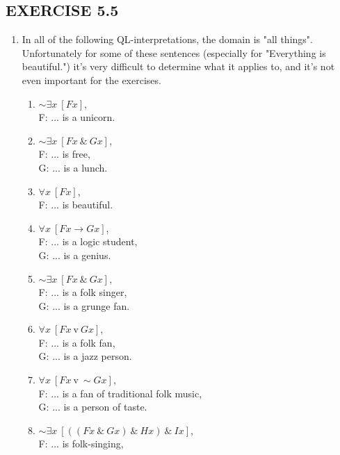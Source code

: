 \documentclass[a4paper,12pt]{article}
\newcommand{\ra}{\rightarrow}
\newcommand{\s}{\sim}
\newcommand{\tv}{ \ \textrm{v} \ }
\newcommand{\ta}{ \ \& \ }
\newcommand{\all}{\forall}
\newcommand{\ex}{\exists}
\begin{document}
    \subsection*{EXERCISE 5.5}

    \begin{enumerate}[label=\arabic*,leftmargin=*]
        \item In all of the following QL-interpretations, the domain is "all things". Unfortunately for some of these sentences (especially for "Everything is beautiful.") it's very difficult to determine what it applies to, and it's not even important for the exercises.
            \begin{enumerate}[label=(\roman*),leftmargin=*]
                \item $\s \ex x \ [Fx]$,\\
                    F: ... is a unicorn.
                \item $\s \ex x \ [Fx \ta Gx]$,\\
                    F: ... is free,\\
                    G: ... is a lunch.
                \item $\all x \ [Fx]$,\\
                    F: ... is beautiful.
                \item $\all x \ [Fx \ra Gx]$,\\
                    F: ... is a logic student,\\
                    G: ... is a genius.
                \item $\s \ex x \ [Fx \ta Gx]$,\\
                    F: ... is a folk singer,\\
                    G: ... is a grunge fan.
                \item $\all x \ [Fx \tv Gx]$,\\
                    F: ... is a folk fan,\\
                    G: ... is a jazz person.
                \item $\all x \ [Fx \tv \s Gx]$,\\
                    F: ... is a fan of traditional folk music,\\
                    G: ... is a person of taste.
                \item $\s \ex x \ [((Fx \ta Gx) \ta Hx) \ta Ix]$,\\
                    F: ... is folk-singing,\\

\end{enumerate}
\end{enumerate}
\end{document}
